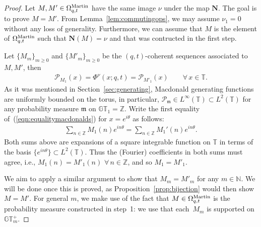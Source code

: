 \documentclass[pdftex]{sigma}
\numberwithin{equation}{section}
\newcommand{\Z}{\mathbb{Z}}
\newcommand{\N}{\mathbb{N}}
\newcommand{\GT}{\mathbb{GT}}
\newcommand{\GTp}{\mathbb{GT}^+}
\newcommand{\PPP}{\mathcal{P}}
\newcommand{\TT}{\mathbb{T}}
\newcommand{\Mart}{\Omega_{q, t}^{\rm Martin}}
\newcommand{\NN}{\mathbf{N}}
\begin{document}
\begin{proof}
Let $M, M'\in\Mart$ have the same image $\nu$ under the map $\NN$. The goal is to prove $M = M'$. From Lemma~\ref{lem:commutingops}, we may assume $\nu_1 = 0$ without any loss of generality. Furthermore, we can assume that $M$ is the element of $\Mart$ such that $\NN(M) = \nu$ and that was contructed in the f\/irst step.

Let $\{M_m\}_{m\geq 0}$ and $\{M'_m\}_{m\geq 0}$ be the $(q, t)$-coherent sequences associated to $M, M'$, then
\begin{gather}\label{eqn:equalitymacdonalds}
\PPP_{M_1}(x) = \Phi^{\nu}(x; q, t) = \PPP_{M'_1}(x) \qquad \forall\, x\in\TT.
\end{gather}
As it was mentioned in Section~\ref{sec:generating}, Macdonald generating functions are uniformly bounded on the torus, in particular, $\PPP_{\mathfrak{m}}\in L^{\infty}(\TT) \subset L^2(\TT)$ for any probability measure $\mathfrak{m}$ on $\GT_1 = \Z$. Write the f\/irst equality of~(\ref{eqn:equalitymacdonalds}) for $x = e^{i\theta}$ as follows:
\begin{gather*}
\sum_{n\in\Z}{M_1(n)e^{in\theta}} = \sum_{n\in\Z}{M_1'(n)e^{in\theta}}.
\end{gather*}
Both sums above are expansions of a square integrable function on $\TT$ in terms of the basis $\{e^{in\theta}\}\subset L^2(\TT)$. Thus the (Fourier) coef\/f\/icients in both sums must agree, i.e., $M_1(n) = M'_1(n)$ $\forall \, n\in\Z$, and so $M_1 = M'_1$.

We aim to apply a similar argument to show that $M_m = M'_m$ for any $m\in\N$. We will be done once this is proved, as Proposition~\ref{prop:bijection} would then show $M = M'$. For general $m$, we make use of the fact that $M\in\Mart$ is the probability measure constructed in step~1: we use that each~$M_m$ is supported on~$\GTp_m$.


\end{proof}
\end{document}
